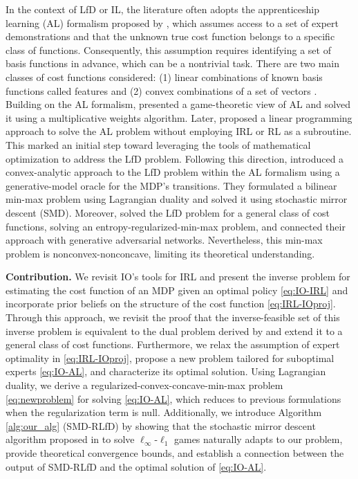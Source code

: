 \documentclass[10pt]{article} %
\begin{document}
In the context of LfD or IL, the literature often adopts the apprenticeship learning (AL) formalism proposed by \cite{Abbeel2004}, which assumes access to a set of expert demonstrations and that the unknown true cost function belongs to a specific class of functions. Consequently, this assumption requires identifying a set of basis functions in advance, which can be a nontrivial task. There are two main classes of cost functions considered: (1) linear combinations of known basis functions called features \citep{Abbeel2004, Syed2007, Ziebart2008} and (2) convex combinations of a set of vectors \citep{Syed2008, Kamoutsi2021}. Building on the AL formalism, \cite{Syed2007} presented a game-theoretic view of AL and solved it using a multiplicative weights algorithm. Later, \cite{Syed2008} proposed a linear programming approach to solve the AL problem without employing IRL or RL as a subroutine. This marked an initial step toward leveraging the tools of mathematical optimization to address the LfD problem. Following this direction, \cite{Kamoutsi2021} introduced a convex-analytic approach to the LfD problem within the AL formalism using a generative-model oracle for the MDP's transitions. They formulated a bilinear min-max problem using Lagrangian duality and solved it using stochastic mirror descent (SMD). Moreover, \cite{Ho2016} solved the LfD problem for a general class of cost functions, solving an entropy-regularized-min-max problem, and connected their approach with generative adversarial networks. Nevertheless, this min-max problem is nonconvex-nonconcave, limiting its theoretical understanding. \par

\textbf{Contribution.} We revisit IO's tools for IRL and present the inverse problem for estimating the cost function of an MDP given an optimal policy \eqref{eq:IO-IRL} \citep{Erkin2010, Chan2023} and incorporate prior beliefs on the structure of the cost function \eqref{eq:IRL-IOproj}. Through this approach, we revisit the proof that the inverse-feasible set of this inverse problem is equivalent to the dual problem derived by \cite{Kamoutsi2021} and extend it to a general class of cost functions. Furthermore, we relax the assumption of expert optimality in \eqref{eq:IRL-IOproj}, propose a new problem tailored for suboptimal experts \eqref{eq:IO-AL}, and characterize its optimal solution. Using Lagrangian duality, we derive a regularized-convex-concave-min-max problem \eqref{eq:newproblem} for solving \eqref{eq:IO-AL}, which reduces to previous formulations \citep{Kamoutsi2021} when the regularization term is null. Additionally, we introduce Algorithm \ref{alg:our_alg} (SMD-RLfD) by showing that the stochastic mirror descent algorithm proposed in \cite{Jin2020} to solve $\ell_\infty$-$\ell_1$ games naturally adapts to our problem, provide theoretical convergence bounds, and establish a connection between the output of SMD-RLfD and the optimal solution of \eqref{eq:IO-AL}. \par
\end{document}
